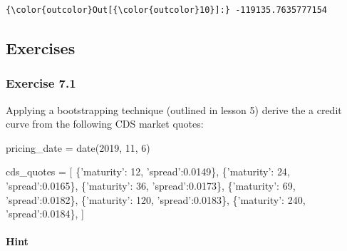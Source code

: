 \documentclass[11pt]{article}
\newenvironment{Shaded}{}{}
\newcommand{\DecValTok}[1]{\textcolor[rgb]{0.25,0.63,0.44}{{#1}}}
\newcommand{\FloatTok}[1]{\textcolor[rgb]{0.25,0.63,0.44}{{#1}}}
\newcommand{\StringTok}[1]{\textcolor[rgb]{0.25,0.44,0.63}{{#1}}}
\newcommand{\NormalTok}[1]{{#1}}
\newcommand{\OperatorTok}[1]{\textcolor[rgb]{0.40,0.40,0.40}{{#1}}}
\begin{document}
\begin{Verbatim}[commandchars=\\\{\}]
{\color{outcolor}Out[{\color{outcolor}10}]:} -119135.7635777154
\end{Verbatim}
            
    \hypertarget{exercises}{%
\subsection{Exercises}\label{exercises}}

\hypertarget{exercise-7.1}{%
\subsubsection{Exercise 7.1}\label{exercise-7.1}}

Applying a bootstrapping technique (outlined in lesson 5) derive the a
credit curve from the following CDS market quotes:

\begin{Shaded}
\begin{Highlighting}[]
\NormalTok{pricing_date }\OperatorTok{=}\NormalTok{ date(}\DecValTok{2019}\NormalTok{, }\DecValTok{11}\NormalTok{, }\DecValTok{6}\NormalTok{)}

\NormalTok{cds_quotes }\OperatorTok{=}\NormalTok{ [}
\NormalTok{    \{}\StringTok{'maturity'}\NormalTok{: }\DecValTok{12}\NormalTok{, }\StringTok{'spread'}\NormalTok{:}\FloatTok{0.0149}\NormalTok{\},}
\NormalTok{    \{}\StringTok{'maturity'}\NormalTok{: }\DecValTok{24}\NormalTok{, }\StringTok{'spread'}\NormalTok{:}\FloatTok{0.0165}\NormalTok{\},}
\NormalTok{    \{}\StringTok{'maturity'}\NormalTok{: }\DecValTok{36}\NormalTok{, }\StringTok{'spread'}\NormalTok{:}\FloatTok{0.0173}\NormalTok{\},}
\NormalTok{    \{}\StringTok{'maturity'}\NormalTok{: }\DecValTok{69}\NormalTok{, }\StringTok{'spread'}\NormalTok{:}\FloatTok{0.0182}\NormalTok{\},}
\NormalTok{    \{}\StringTok{'maturity'}\NormalTok{: }\DecValTok{120}\NormalTok{, }\StringTok{'spread'}\NormalTok{:}\FloatTok{0.0183}\NormalTok{\},}
\NormalTok{    \{}\StringTok{'maturity'}\NormalTok{: }\DecValTok{240}\NormalTok{, }\StringTok{'spread'}\NormalTok{:}\FloatTok{0.0184}\NormalTok{\},}
\NormalTok{]}
\end{Highlighting}
\end{Shaded}

\hypertarget{hint}{%
\paragraph{Hint}\label{hint}}
\end{document}
